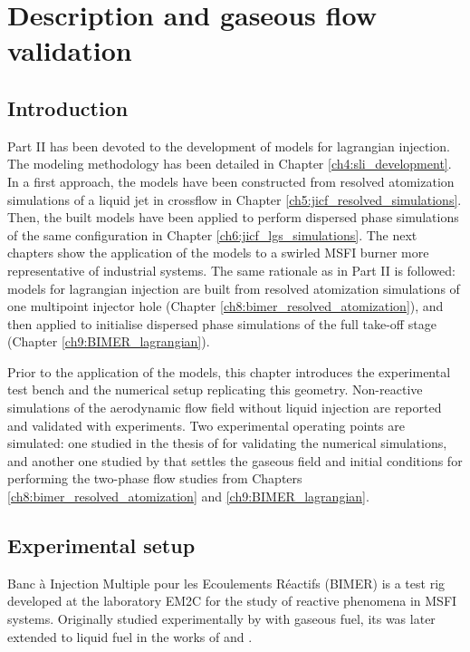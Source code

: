 \chapter{Description and gaseous flow validation}
	\label{ch7:bimer_test_bench_and_aero}

\section{Introduction}

Part II has been devoted to the development of models for lagrangian injection. The modeling methodology has been detailed in Chapter \ref{ch4:sli_development}. In a first approach, the models have been constructed from resolved atomization simulations of a liquid jet in crossflow in Chapter \ref{ch5:jicf_resolved_simulations}. Then, the built models have been applied to perform dispersed phase simulations of the same configuration in Chapter \ref{ch6:jicf_lgs_simulations}. The next chapters show the application of the models to a swirled MSFI burner more representative of industrial systems. The same rationale as in Part II is followed: models for lagrangian injection are built from resolved atomization simulations of one multipoint injector hole (Chapter \ref{ch8:bimer_resolved_atomization}), and then applied to initialise dispersed phase simulations of the full take-off stage (Chapter \ref{ch9:BIMER_lagrangian}). 

Prior to the application of the models, this chapter introduces the experimental test bench and the numerical setup replicating this geometry. Non-reactive simulations of the aerodynamic flow field without liquid injection are reported and validated with experiments. Two experimental operating points are simulated: one studied in the thesis of  for validating the numerical simulations, and another one studied by  that settles the gaseous field and initial conditions for performing the two-phase flow studies from Chapters \ref{ch8:bimer_resolved_atomization} and \ref{ch9:BIMER_lagrangian}.


\section{Experimental setup}

Banc à Injection Multiple pour les Ecoulements Réactifs (BIMER) is a test rig developed at the laboratory EM2C for the study of reactive phenomena in MSFI systems. Originally studied experimentally by  with gaseous fuel, its was later extended to liquid fuel in the works of  and .

